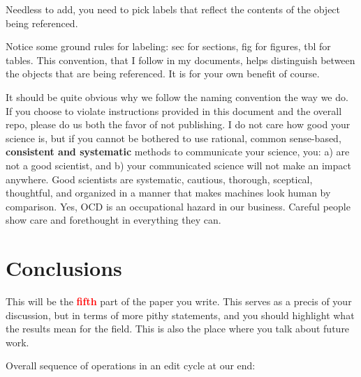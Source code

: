 \documentclass[12 pt]{article}
\begin{document}
Needless to add, you need to pick labels that reflect the contents of the object being referenced.

Notice some ground rules for labeling: sec for sections, fig for figures, tbl for tables. This convention, that I follow in my documents, helps distinguish between the objects that are being referenced. It is for your own benefit of course.

It should be quite obvious why we follow the naming convention the way we do. If you choose to violate instructions provided in this document and the overall repo, please do us both the favor of not publishing. I do not care how good your science is, but if you cannot be bothered to use rational, common sense-based, \textbf{consistent and systematic} methods to communicate your science, you: a) are not a good scientist, and b) your communicated science will not make an impact anywhere. Good scientists are systematic, cautious, thorough, sceptical, thoughtful, and organized in a manner that makes machines look human by comparison. Yes, OCD is an occupational hazard in our business. Careful people show care and forethought in everything they can.

\section{Conclusions}
\label{sec:conclusions}

This will be the \textbf{\Huge \textcolor{red}{fifth}} part of the paper you write. This serves as a precis of your discussion, but in terms of more pithy statements, and you should highlight what the results mean for the field. This is also the place where you talk about future work.

Overall sequence of operations in an edit cycle at our end:
\end{document}

